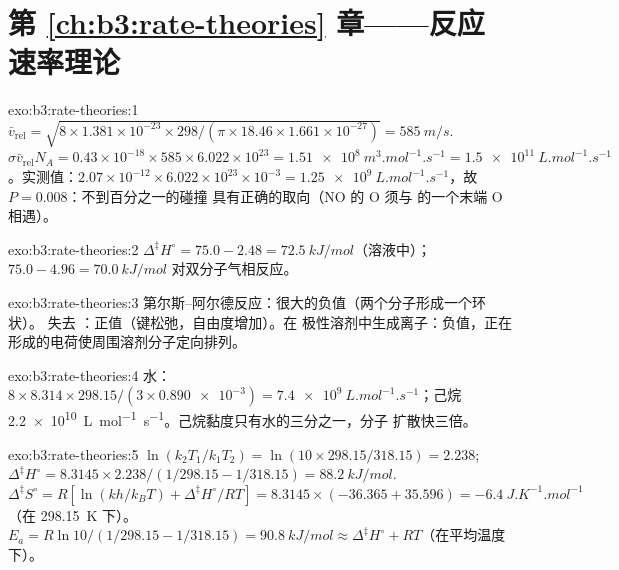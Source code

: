 \section*{第 \ref{ch:b3:rate-theories} 章——反应速率理论}

\begin{solution}{exo:b3:rate-theories:1}
$\bar v_{\mathrm{rel}} = \sqrt{8 \times 1.381\times10^{-23} \times 298/(\pi \times 18.46 \times 1.661\times10^{-27})} = \qty{585}{m/s}$.
$\sigma\bar v_{\mathrm{rel}}N_A = 0.43\times10^{-18} \times 585 \times 6.022\times10^{23} = \qty{1.51e8}{m^3.mol^{-1}.s^{-1}} =
\qty{1.5e11}{L.mol^{-1}.s^{-1}}$。实测值：$2.07\times10^{-12} \times 6.022\times10^{23}\times10^{-3} =
\qty{1.25e9}{L.mol^{-1}.s^{-1}}$，故 $P = 0.008$：不到百分之一的碰撞
具有正确的取向（NO 的 O 须与  的一个末端 O 相遇）。
\end{solution}

\begin{solution}{exo:b3:rate-theories:2}
$\Delta^{\ddagger}H^\circ = 75.0 - 2.48 = \qty{72.5}{kJ/mol}$（溶液中）；$75.0 - 4.96 = \qty{70.0}{kJ/mol}$
对双分子气相反应。
\end{solution}

\begin{solution}{exo:b3:rate-theories:3}
第尔斯–阿尔德反应：很大的负值（两个分子形成一个环状）。
失去 ：正值（键松弛，自由度增加）。在
极性溶剂中生成离子：负值，正在形成的电荷使周围溶剂分子定向排列。
\end{solution}

\begin{solution}{exo:b3:rate-theories:4}
水：$8 \times 8.314 \times 298.15/(3 \times \num{0.890e-3}) = \qty{7.4e9}{L.mol^{-1}.s^{-1}}$；己烷
\qty{2.2e10}{L.mol^{-1}.s^{-1}}。己烷黏度只有水的三分之一，分子
扩散快三倍。
\end{solution}

\begin{solution}{exo:b3:rate-theories:5}
$\ln(k_2T_1/k_1T_2) = \ln(10 \times 298.15/318.15) = 2.238$; $\Delta^{\ddagger}H^\circ = 8.3145 \times 2.238/(1/298.15 -
1/318.15) = \qty{88.2}{kJ/mol}$. $\Delta^{\ddagger}S^\circ = R[\ln(kh/k_BT) + \Delta^{\ddagger}H^\circ/RT] = 8.3145 \times
(-36.365 + 35.596) = \qty{-6.4}{J.K^{-1}.mol^{-1}}$（在 \qty{298.15}{K} 下）。$E_a = R\ln10/(1/298.15 - 1/318.15) =
\qty{90.8}{kJ/mol} \approx \Delta^{\ddagger}H^\circ + RT$（在平均温度下）。
\end{solution}

